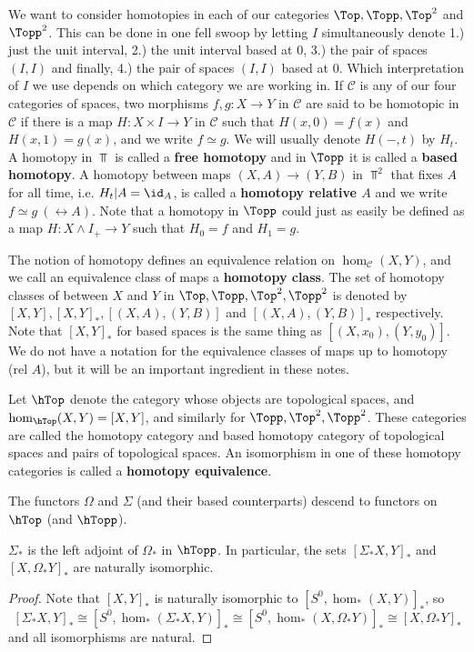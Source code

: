 We want to consider homotopies in each of our categories $\Top,\Topp,\Top^2$ and $\Topp^2$. This can be done in one fell swoop by letting $I$ simultaneously denote 1.) just the unit interval, 2.) the unit interval based at 0, 3.) the pair of spaces $(I,I)$ and finally, 4.) the pair of spaces $(I,I)$ based at 0. Which interpretation of $I$ we use depends on which category we are working in. If $\mathscr C$ is any of our four categories of spaces, two morphisms $f,g : X \rightarrow Y$ in $\mathscr C$ are said to be homotopic in $\mathscr C$ if there is a map $H : X \times I \rightarrow Y$ in $\mathscr C$ such that $H(x,0) = f(x)$ and $H(x,1) = g(x)$, and we write $f \simeq g$. We will usually denote $H(-,t)$ by $H_t$. A homotopy in $\Top$ is called a \textbf{free homotopy} and in $\Topp$ it is called a \textbf{based homotopy}. A homotopy between maps $(X,A) \rightarrow (Y,B)$ in $\Top^2$ that fixes $A$ for all time, i.e. $H_t|A = \id_A$, is called a \textbf{homotopy relative $A$} and we write $f \simeq g \ (\rel A)$. Note that a homotopy in $\Topp$ could just as easily be defined as a map $H : X \wedge I_+ \rightarrow Y$ such that $H_0 = f$ and $H_1 = g$. 

The notion of homotopy defines an equivalence relation on $\hom_{\mathscr C}(X,Y)$, and we call an equivalence class of maps a \textbf{homotopy class}. The set of homotopy classes of between $X$ and $Y$ in $\Top,\Topp,\Top^2,\Topp^2$ is denoted by $[X,Y], [X,Y]_*, [(X,A),(Y,B)]$ and $[(X,A),(Y,B)]_*$ respectively. Note that $[X,Y]_*$ for based spaces is the same thing as $[(X,x_0),(Y,y_0)]$. We do not have a notation for the equivalence classes of maps up to homotopy (rel $A$), but it will be an important ingredient in these notes.

Let $\hTop$ denote the category whose objects are topological spaces, and $\hom_{\hTop}(X,Y) = [X,Y]$, and similarly for $\Topp,\Top^2,\Topp^2$. These categories are called the homotopy category and based homotopy category of topological spaces and pairs of topological spaces. An isomorphism in one of these homotopy categories is called a \textbf{homotopy equivalence}.

The functors $\Omega$ and $\Sigma$ (and their based counterparts) descend to functors on $\hTop$ (and $\hTopp$).
\begin{prop}
\label{suspension and loop space are adjoint}
$\Sigma_*$ is the left adjoint of $\Omega_*$ in $\hTopp$. In particular, the sets $[\Sigma_* X,Y]_*$ and $[X,\Omega_* Y]_*$ are naturally isomorphic.
\end{prop}
\begin{proof}
Note that $[X,Y]_*$ is naturally isomorphic to $[S^0,\hom_*(X,Y)]_*$, so 
\[ [\Sigma_*X,Y]_* \cong [S^0,\hom_*(\Sigma_*X,Y)]_* \cong [S^0,\hom_*(X,\Omega_*Y)]_* \cong [X,\Omega_*Y]_* \]
and all isomorphisms are natural.
\end{proof}







